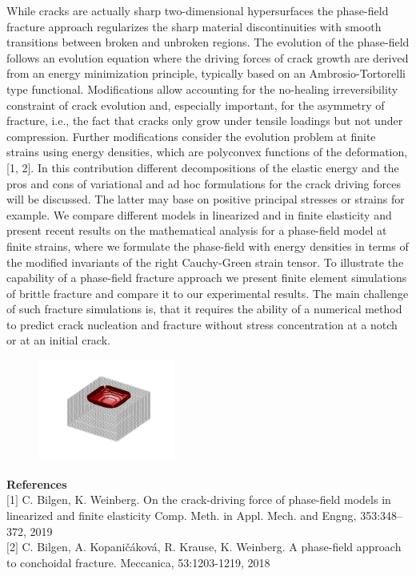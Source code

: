 While cracks are actually sharp two-dimensional hypersurfaces the phase-field fracture approach
regularizes the sharp material discontinuities with smooth transitions between broken and unbroken regions. The evolution of the phase-field follows an evolution equation where the driving
forces of crack growth are derived from an energy minimization principle, typically based on
an Ambrosio-Tortorelli type functional. Modifications allow accounting for the no-healing irreversibility constraint of crack evolution and, especially important, for the asymmetry of fracture,
i.e., the fact that cracks only grow under tensile loadings but not under compression. Further
modifications consider the evolution problem at finite strains using energy densities, which are
polyconvex functions of the deformation, [1, 2].
In this contribution different decompositions of the elastic energy and the pros and cons of
variational and ad hoc formulations for the crack driving forces will be discussed. The latter
may base on positive principal stresses or strains for example. We compare different models in
linearized and in finite elasticity and present recent results on the mathematical analysis for a
phase-field model at finite strains, where we formulate the phase-field with energy densities in
terms of the modified invariants of the right Cauchy-Green strain tensor. To illustrate the capability of a phase-field fracture approach we present finite element simulations of brittle fracture
and compare it to our experimental results. The main challenge of such fracture simulations
is, that it requires the ability of a numerical method to predict crack nucleation and fracture
without stress concentration at a notch or at an initial crack.
\begin{figure}[h]
\centering
\includegraphics[width=0.4\textwidth]{data/BM3D_Yeoh_TS80_iso.png}
\vspace{-1cm}
\end{figure}

\noindent\textbf{References}\\
$[$1$]$ C. Bilgen, K. Weinberg. On the crack-driving force of phase-field models in linearized and
finite elasticity Comp. Meth. in Appl. Mech. and Engng, 353:348–372, 2019\\\newline
$[$2$]$ C. Bilgen, A. Kopaničáková, R. Krause, K. Weinberg. A phase-field approach to conchoidal
fracture. Meccanica, 53:1203-1219, 2018
